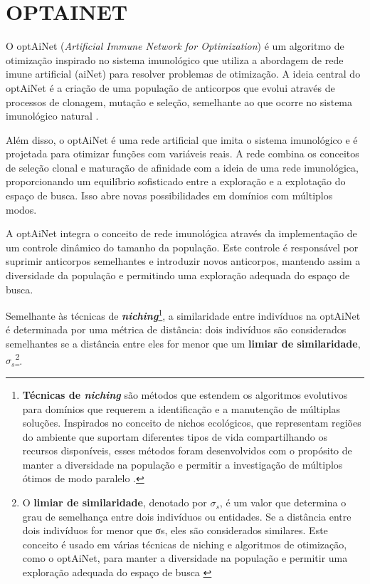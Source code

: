 \chapter{\MakeUppercase{optAiNet}} \thispagestyle{mystyle}

O optAiNet (\textit{Artificial Immune Network for Optimization}) é um algoritmo de otimização inspirado no sistema imunológico que utiliza a abordagem de rede imune artificial (aiNet) para resolver problemas de otimização. A ideia central do optAiNet é a criação de uma população de anticorpos que evolui através de processos de clonagem, mutação e seleção, semelhante ao que ocorre no sistema imunológico natural \cite{optainet2015}.

Além disso, o optAiNet é uma rede artificial que imita o sistema imunológico e é projetada para otimizar funções com variáveis reais. A rede combina os conceitos de seleção clonal e maturação de afinidade com a ideia de uma rede imunológica, proporcionando um equilíbrio sofisticado entre a exploração e a explotação do espaço de busca. Isso abre novas possibilidades em domínios com múltiplos modos.

A optAiNet integra o conceito de rede imunológica através da implementação de um controle dinâmico do tamanho da população. Este controle é responsável por suprimir anticorpos semelhantes e introduzir novos anticorpos, mantendo assim a diversidade da população e permitindo uma exploração adequada do espaço de busca.

Semelhante às técnicas de \textbf{\textit{niching}}\footnote{\textbf{Técnicas de \textit{niching}} são métodos que estendem os algoritmos evolutivos para domínios que requerem a identificação e a manutenção de múltiplas soluções. Inspirados no conceito de nichos ecológicos, que representam regiões do ambiente que suportam diferentes tipos de vida compartilhando os recursos disponíveis, esses métodos foram desenvolvidos com o propósito de manter a diversidade na população e permitir a investigação de múltiplos ótimos de modo paralelo \cite{niching2024}.}, a similaridade entre indivíduos na optAiNet é determinada por uma métrica de distância: dois indivíduos são considerados semelhantes se a distância entre eles for menor que um \textbf{limiar de similaridade}, $\sigma_s$\footnote{O \textbf{limiar de similaridade}, denotado por $\sigma_s$, é um valor que determina o grau de semelhança entre dois indivíduos ou entidades. Se a distância entre dois indivíduos for menor que σs, eles são considerados similares. Este conceito é usado em várias técnicas de niching e algoritmos de otimização, como o optAiNet, para manter a diversidade na população e permitir uma exploração adequada do espaço de busca \cite{limiarizacao2024}}.

